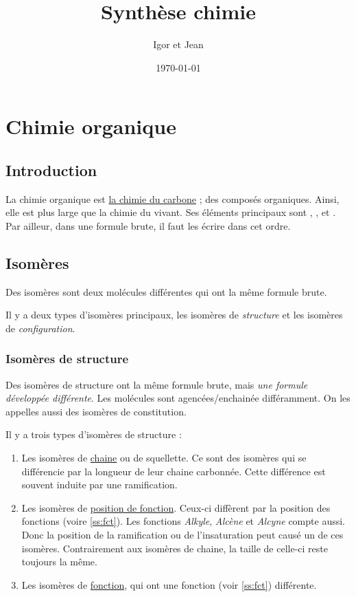 \documentclass[a4paper]{article}
\author{Igor et Jean}
\date{\today}
\title{Synthèse chimie}
\begin{document}
    \maketitle
    \tableofcontents
    \section{Chimie organique}
    \subsection{Introduction}

    La chimie organique est \underline{la chimie du carbone} ; des composés
    organiques.  Ainsi, elle est plus large que la chimie du vivant. Ses
    éléments principaux sont , ,  et . Par ailleur, dans
    une formule brute, il faut les écrire dans cet ordre.

    \subsection{Isomères}
    Des isomères sont deux molécules différentes qui ont la même formule brute.

    Il y a deux types d'isomères principaux, les isomères de
    \emph{structure} et les isomères de \emph{configuration}.

    \subsubsection{Isomères de structure}

    Des isomères de structure ont la même formule brute, mais \emph{une
    formule développée différente}. Les molécules sont agencées/enchainée
    différamment. On les appelles aussi des isomères de constitution.

    Il y a trois types d'isomères de structure :

    \begin{enumerate}
        \item Les isomères de \underline{chaine} ou de squellette. Ce sont des
        isomères qui se différencie par la longueur de leur chaine carbonnée.
        Cette différence est souvent induite par une ramification.
        \label{enum:isochaine}
        \item Les isomères de \underline{position de fonction}. Ceux-ci
        diffèrent par la position des fonctions (voire \ref{ss:fct}). Les
        fonctions \textit{Alkyle}, \textit{Alcène} et \emph{Alcyne} compte
        aussi. Donc la position de la ramification ou de l'insaturation peut
        causé un de ces isomères. Contrairement aux isomères de chaine, la
        taille de celle-ci reste toujours la même. \label{enum:isopos}
        \item Les isomères de \underline{fonction}, qui ont une fonction (voir
        \ref{ss:fct}) différente.
        \end{enumerate}
\end{document}
